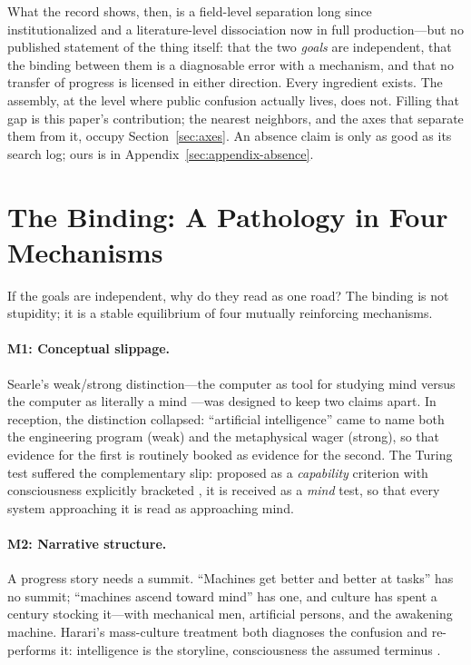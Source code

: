 \documentclass[10pt]{article}
\begin{document}
What the record shows, then, is a field-level separation long since institutionalized and a literature-level dissociation now in full production---but no published statement of the thing itself: that the two \emph{goals} are independent, that the binding between them is a diagnosable error with a mechanism, and that no transfer of progress is licensed in either direction. Every ingredient exists. The assembly, at the level where public confusion actually lives, does not. Filling that gap is this paper's contribution; the nearest neighbors, and the axes that separate them from it, occupy Section~\ref{sec:axes}. An absence claim is only as good as its search log; ours is in Appendix~\ref{sec:appendix-absence}.

\section{The Binding: A Pathology in Four Mechanisms}\label{sec:pathology}

If the goals are independent, why do they read as one road? The binding is not stupidity; it is a stable equilibrium of four mutually reinforcing mechanisms.

\paragraph{M1: Conceptual slippage.} Searle's weak/strong distinction---the computer as tool for studying mind versus the computer as literally a mind \cite{searle1980}---was designed to keep two claims apart. In reception, the distinction collapsed: ``artificial intelligence'' came to name both the engineering program (weak) and the metaphysical wager (strong), so that evidence for the first is routinely booked as evidence for the second. The Turing test suffered the complementary slip: proposed as a \emph{capability} criterion with consciousness explicitly bracketed \cite{turing1950}, it is received as a \emph{mind} test, so that every system approaching it is read as approaching mind.

\paragraph{M2: Narrative structure.} A progress story needs a summit. ``Machines get better and better at tasks'' has no summit; ``machines ascend toward mind'' has one, and culture has spent a century stocking it---with mechanical men, artificial persons, and the awakening machine. Harari's mass-culture treatment both diagnoses the confusion and re-performs it: intelligence is the storyline, consciousness the assumed terminus \cite{harari2024nexus}.
\end{document}
